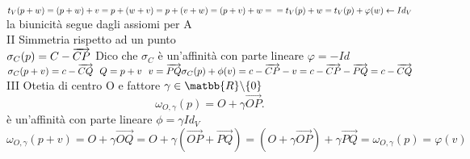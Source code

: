 \documentclass[12px]{article}
\theoremstyle{break}
\theoremstyle{break}
\theoremstyle{break}
\theoremstyle{break}
\theoremstyle{break}
\theoremstyle{break}
\begin{document}
$t_V(p + w) = (p + w) + v = p + (w + v) = p + (v + w) = (p + v) + w =\\ = t_V(p) + w = t_V(p) +  \varphi (w) \leftarrow Id_V$ \\
la biunicità segue dagli assiomi per A \\[10px]
II Simmetria rispetto ad un punto\\
$\sigma_C(p) = C - \overrightarrow{CP}\\
$ Dico che $\sigma_C$ è un'affinità con parte lineare $ \varphi = -Id$\\
$\sigma_C(p + v) = c - \overrightarrow{CQ} \ \ Q = p + v \ \ v = \overrightarrow{PQ} \\
\sigma_C(p) + \phi(v) = c - \overrightarrow{CP} - v = c - \overrightarrow{CP} - \overrightarrow{PQ} = c - \overrightarrow{CQ}$ \\
III Otetia di centro O e fattore $\gamma\in\matbb{R}\backslash \{ 0 \} $ \\ 
\[
	\omega_{O,\gamma}(p) = O + \gamma \overrightarrow{OP}
.\] 
è un'affinità con parte lineare $\phi = \gamma Id_V$\\
$\omega_{O,\gamma}(p + v) = O + \gamma \overrightarrow{OQ} = O + \gamma( \overrightarrow{OP} + \overrightarrow{PQ}) = (O + \gamma \overrightarrow{OP}) + \gamma \overrightarrow{PQ} = \omega_{O,\gamma}(p) = \varphi(v)$
\end{document}

